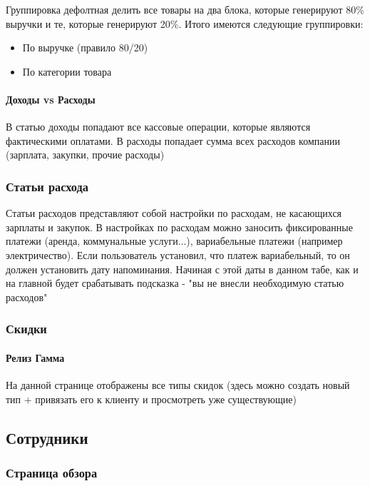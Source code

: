 \documentclass[DIV=calc, paper=a4, fontsize=11pt]{scrartcl} %
\begin{document}
Группировка дефолтная делить все товары на два блока, которые генерируют 80\% выручки и те, которые генерируют 20\%. Итого имеются следующие группировки:

\begin{itemize}
	\item По выручке (правило 80/20)
	\item По категории товара
\end{itemize}

\paragraph{Доходы vs Расходы}
В статью доходы попадают все кассовые операции, которые являются фактическими оплатами. В расходы попадает сумма всех расходов компании (зарплата, закупки, прочие расходы)

\subsubsection{Статьи расхода}
Статьи расходов представляют собой настройки по расходам, не касающихся зарплаты и закупок. В настройках по расходам можно заносить фиксированные платежи (аренда, коммунальные услуги...), вариабельные платежи (например электричество). Если пользователь установил, что платеж вариабельный, то он должен установить дату напоминания. Начиная с этой даты в данном табе, как и на главной будет срабатывать подсказка - "вы не внесли необходимую статью расходов"

\subsubsection{Скидки}

\paragraph{Релиз Гамма}
На данной странице отображены все типы скидок (здесь можно создать новый тип + привязать его к клиенту и просмотреть уже существующие)



\subsection{Сотрудники}

\subsubsection{Страница обзора}
\end{document}
